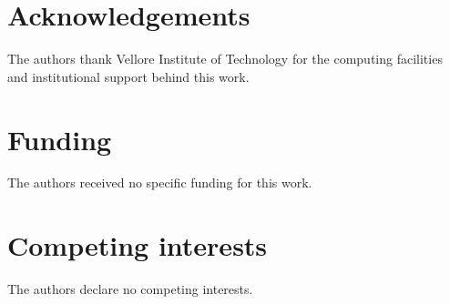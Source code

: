 \section*{Acknowledgements}
The authors thank Vellore Institute of Technology for the computing facilities and institutional support behind this work.

\section*{Funding}
The authors received no specific funding for this work.

\section*{Competing interests}
The authors declare no competing interests.
